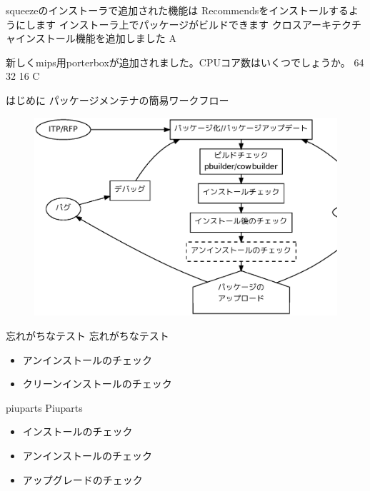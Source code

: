 \santaku
{squeezeのインストーラで追加された機能は}
{Recommendsをインストールするようにします}
{インストーラ上でパッケージがビルドできます}
{クロスアーキテクチャインストール機能を追加しました}
{A}

\santaku
{新しくmips用porterboxが追加されました。CPUコア数はいくつでしょうか。}
{64}
{32}
{16}
{C}



\begin{frame}{はじめに}
パッケージメンテナの簡易ワークフロー

\begin{figure}[h]
\includegraphics[height=0.6\hsize]{image201004/devwork.eps}
\label{fig:devwork}
\end{figure}

\end{frame}


\begin{frame}{忘れがちなテスト}
忘れがちなテスト
\begin{itemize}
\item アンインストールのチェック
\item クリーンインストールのチェック
\end{itemize}
\end{frame}

\begin{frame}{piuparts}
Piuparts\\
\begin{itemize}
\item インストールのチェック
\item アンインストールのチェック
\item アップグレードのチェック
\end{itemize}
\end{frame}


